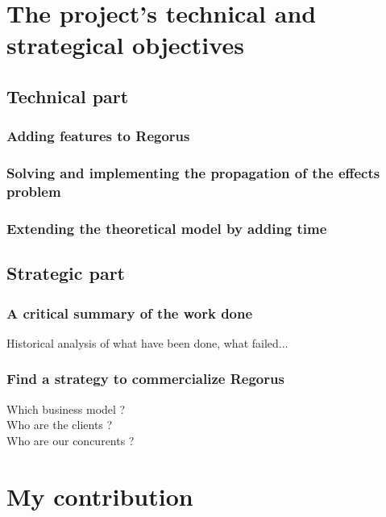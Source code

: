 \documentclass[10pt]{article}
\begin{document}
\newpage

\section{The project's technical and strategical objectives}
\subsection{Technical part}
\subsubsection{Adding features to Regorus}
\subsubsection{Solving and implementing the propagation of the effects problem}
\subsubsection{Extending the theoretical model by adding time}

\subsection{Strategic part}
\subsubsection{A critical summary of the work done}
Historical analysis of what have been done, what failed...

\subsubsection{Find a strategy to commercialize Regorus}
Which business model ?\\
Who are the clients ?\\
Who are our concurents ?\\

\section{My contribution}


\newpage


\newpage

\pagestyle{plain}
\nocite{*}
\printbibliography[title={Book references},type=book]
\printbibliography[title={Article references},type=article]
\printbibliography[title={Online references},type=online]

\printbibliography[title={Other references}, nottype=online,nottype=article, nottype=book]
\end{document}
